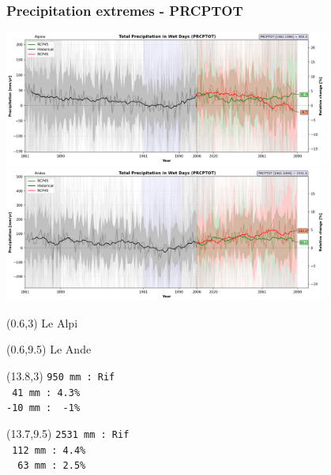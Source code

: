 
\begin{frame}
\frametitle{Precipitation extremes - PRCPTOT}
\begin{center}

{\includegraphics[width=0.8\textwidth]{risultati/prcptot_Alpine_Models_ts}}
{\includegraphics[width=0.8\textwidth]{risultati/prcptot_Andes_Models_ts}}
\end{center}

{
  \scriptsize
  \begin{textblock}{1.8}(0.6,3)
     {\color{gray} Le Alpi}
  \end{textblock}
}


{
  \scriptsize
  \begin{textblock}{1.8}(0.6,9.5)
     {\color{gray} Le Ande}
  \end{textblock}
}

{ \tiny
  \begin{textblock}{3}(13.8,3)
     {\color{CadetBlue}   \texttt{950 mm : Rif}} \\
     {\color{red}         \texttt{ 41 mm : 4.3\% }}\\
     {\color{ForestGreen} \texttt{-10 mm : \ -1\% }}
  \end{textblock}
}

{ \tiny
  \begin{textblock}{3}(13.7,9.5)
     {\color{CadetBlue}   \texttt{2531 mm : Rif}} \\
     {\color{red}         \texttt{ 112  mm : 4.4\% }} \\
     {\color{ForestGreen} \texttt{ \ 63  mm : 2.5\%  }}
  \end{textblock}
}

\end{frame}

%
